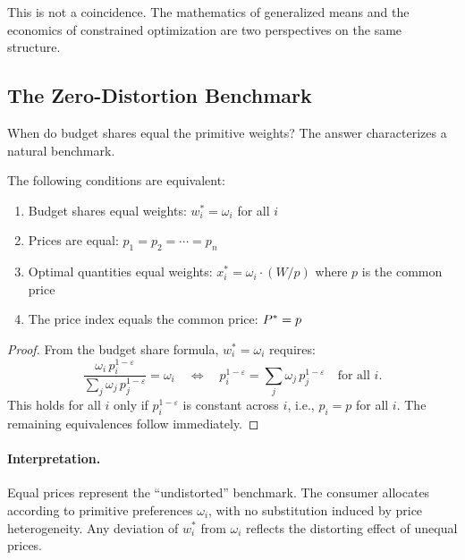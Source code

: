 This is not a coincidence. The mathematics of generalized means and the economics of constrained optimization are two perspectives on the same structure.

\subsection{The Zero-Distortion Benchmark}
\label{subsec:zero-distortion}

When do budget shares equal the primitive weights? The answer characterizes a natural benchmark.

\begin{proposition}
\label{prop:zero-distortion}
The following conditions are equivalent:
\begin{enumerate}[label=(\roman*), leftmargin=2em]
    \item Budget shares equal weights: $w_i^* = \omega_i$ for all $i$
    \item Prices are equal: $p_1 = p_2 = \cdots = p_n$
    \item Optimal quantities equal weights: $x_i^* = \omega_i \cdot (W/p)$ where $p$ is the common price
    \item The price index equals the common price: $P^{*} = p$
\end{enumerate}
\end{proposition}

\begin{proof}
From the budget share formula, $w_i^* = \omega_i$ requires:
\[
\frac{\omega_i \, p_i^{1-\varepsilon}}{\sum_j \omega_j \, p_j^{1-\varepsilon}} = \omega_i \quad \Longleftrightarrow \quad p_i^{1-\varepsilon} = \sum_j \omega_j \, p_j^{1-\varepsilon} \quad \text{for all } i.
\]
This holds for all $i$ only if $p_i^{1-\varepsilon}$ is constant across $i$, i.e., $p_i = p$ for all $i$. The remaining equivalences follow immediately.
\end{proof}

\paragraph{Interpretation.}
Equal prices represent the ``undistorted'' benchmark. The consumer allocates according to primitive preferences $\omega_i$, with no substitution induced by price heterogeneity. Any deviation of $w_i^*$ from $\omega_i$ reflects the distorting effect of unequal prices.

